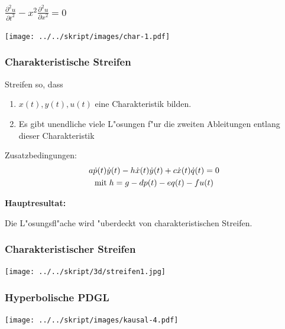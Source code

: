 \begin{frame}
\frametitle{$\displaystyle \frac{\partial^2u}{\partial t^2}-x^2\frac{\partial^2 u}{\partial x^2}=0$}
\pause
\begin{center}
\texttt{[image: ../../skript/images/char-1.pdf]}
\end{center}
\end{frame}

\begin{frame}
\frametitle{Charakteristische Streifen}
Streifen so, dass
\begin{enumerate}
\item
$x(t), y(t), u(t)$ eine Charakteristik bilden.
\item
Es gibt unendliche viele L"osungen f"ur die zweiten Ableitungen entlang
dieser Charakteristik
\end{enumerate}

Zusatzbedingungen:
\begin{gather*}
a\dot p(t)\dot y(t)
-
h \dot x(t) \dot y(t)
+
c \dot x(t)\dot q(t)=0
\\
\text{mit\;}
h=g-dp(t)-eq(t)-fu(t)
\end{gather*}

\bigskip

{\bf Hauptresultat:}
\medskip

\begin{theorem}
Die L"osungsfl"ache wird "uberdeckt von charakteristischen Streifen.
\end{theorem}

\end{frame}

\begin{frame}
\frametitle{Charakteristischer Streifen}
\begin{center}
\texttt{[image: ../../skript/3d/streifen1.jpg]}
\end{center}
\end{frame}


\begin{frame}
\frametitle{Hyperbolische PDGL}
\begin{center}
\texttt{[image: ../../skript/images/kausal-4.pdf]}
\end{center}
\end{frame}

